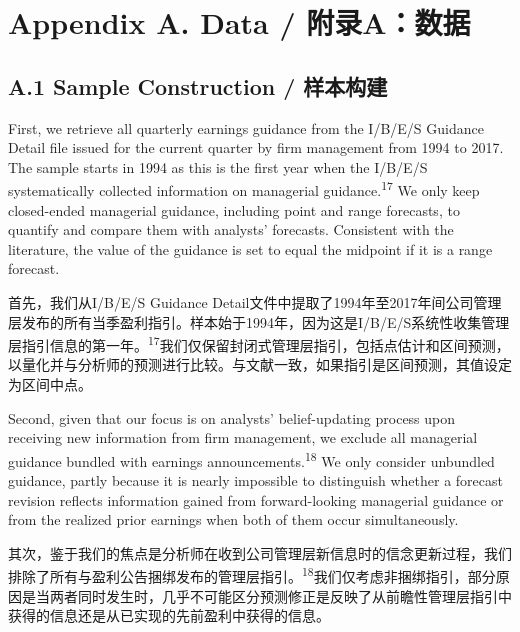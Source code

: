 \documentclass[12pt,a4paper]{article}
\newenvironment{original}
  {\par\medskip\noindent\ignorespaces}
  {\par\medskip}
\newenvironment{translation}
  {\par\noindent{\color{transblue}\ignorespaces}}
  {\par\bigskip}
\begin{document}
\section{Appendix A. Data / 附录A：数据}

\subsection{A.1 Sample Construction / 样本构建}

\begin{original}
First, we retrieve all quarterly earnings guidance from the I/B/E/S Guidance Detail file issued for the current quarter by firm management from 1994 to 2017. The sample starts in 1994 as this is the first year when the I/B/E/S systematically collected information on managerial guidance.\textsuperscript{17} We only keep closed-ended managerial guidance, including point and range forecasts, to quantify and compare them with analysts' forecasts. Consistent with the literature, the value of the guidance is set to equal the midpoint if it is a range forecast.
\end{original}
\begin{translation}
首先，我们从I/B/E/S Guidance Detail文件中提取了1994年至2017年间公司管理层发布的所有当季盈利指引。样本始于1994年，因为这是I/B/E/S系统性收集管理层指引信息的第一年。\textsuperscript{17}我们仅保留封闭式管理层指引，包括点估计和区间预测，以量化并与分析师的预测进行比较。与文献一致，如果指引是区间预测，其值设定为区间中点。
\end{translation}

\begin{original}
Second, given that our focus is on analysts' belief-updating process upon receiving new information from firm management, we exclude all managerial guidance bundled with earnings announcements.\textsuperscript{18} We only consider unbundled guidance, partly because it is nearly impossible to distinguish whether a forecast revision reflects information gained from forward-looking managerial guidance or from the realized prior earnings when both of them occur simultaneously.
\end{original}
\begin{translation}
其次，鉴于我们的焦点是分析师在收到公司管理层新信息时的信念更新过程，我们排除了所有与盈利公告捆绑发布的管理层指引。\textsuperscript{18}我们仅考虑非捆绑指引，部分原因是当两者同时发生时，几乎不可能区分预测修正是反映了从前瞻性管理层指引中获得的信息还是从已实现的先前盈利中获得的信息。
\end{translation}
\end{document}

